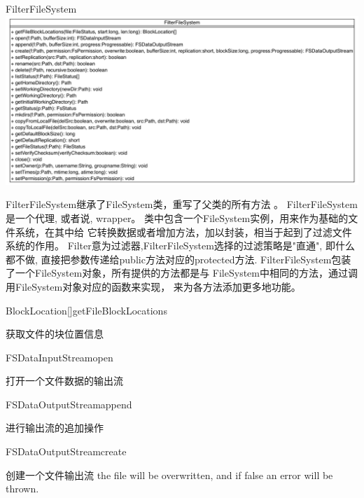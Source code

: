 \begin{XeClass}{FilterFileSystem}
\includegraphics[width=\textwidth]{cdig/FilterFileSystem.png}
     
 FilterFileSystem继承了FileSystem类，重写了父类的所有方法 。
 FilterFileSystem是一个代理, 或者说, wrapper。
 类中包含一个FileSystem实例，用来作为基础的文件系统，在其中给
 它转换数据或者增加方法，加以封装，相当于起到了过滤文件系统的作用。
 Filter意为过滤器,FilterFileSystem选择的过滤策略是"直通",
 即什么都不做, 直接把参数传递给public方法对应的protected方法.
 FilterFileSystem包装了一个FileSystem对象，所有提供的方法都是与
 FileSystem中相同的方法，通过调用FileSystem对象对应的函数来实现，
 来为各方法添加更多地功能。

    \begin{XeMethod}{\XePublic}{BlockLocation[]}{getFileBlockLocations}
         
 获取文件的块位置信息

    \end{XeMethod}

    \begin{XeMethod}{\XePublic}{FSDataInputStream}{open}
         
 打开一个文件数据的输出流

    \end{XeMethod}

    \begin{XeMethod}{\XePublic}{FSDataOutputStream}{append}
         
 进行输出流的追加操作

    \end{XeMethod}

    \begin{XeMethod}{\XePublic}{FSDataOutputStream}{create}
         
 创建一个文件输出流
 the file will be overwritten, and if false an error will be thrown.

    \end{XeMethod}


\end{XeClass}
